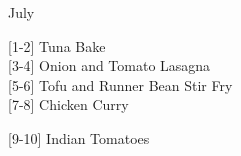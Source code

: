 		\begin{menu}{July}
    
    \begin{recipelist}
    
        {\scriptsize[1-2]} Tuna Bake\\
        {\scriptsize[3-4]} Onion and Tomato Lasagna\\
        {\scriptsize[5-6]} Tofu and Runner Bean Stir Fry\\
        {\scriptsize[7-8]} Chicken Curry\\%
    \end{recipelist}%
    \begin{recipelist}
    
        {\scriptsize[9-10]} Indian Tomatoes\\
    \end{recipelist}\par%
  

\end{menu}
